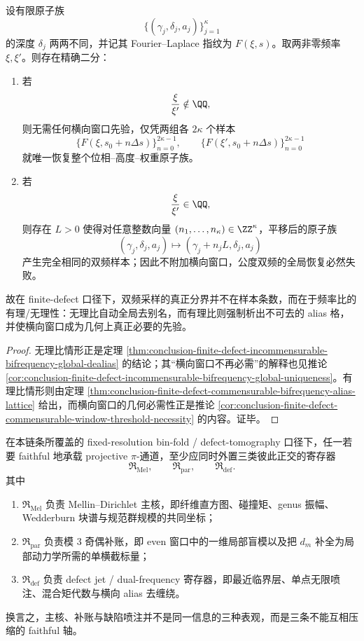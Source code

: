 \begin{theorem}\label{thm:conclusion-bifrequency-dealias-rational-irrational-dichotomy}
设有限原子族
\[
\{(\gamma_j,\delta_j,a_j)\}_{j=1}^{\kappa}
\]
的深度 \(\delta_j\) 两两不同，并记其 Fourier--Laplace 指纹为 \(F(\xi,s)\)。取两非零频率 \(\xi,\xi'\)。则存在精确二分：
\begin{enumerate}
  \item 若
  \[
  \frac{\xi}{\xi'}\notin\QQ,
  \]
  则无需任何横向窗口先验，仅凭两组各 \(2\kappa\) 个样本
  \[
  \{F(\xi,s_0+n\Delta s)\}_{n=0}^{2\kappa-1},
  \qquad
  \{F(\xi',s_0+n\Delta s)\}_{n=0}^{2\kappa-1}
  \]
  就唯一恢复整个位相--高度--权重原子族。
  \item 若
  \[
  \frac{\xi}{\xi'}\in\QQ,
  \]
  则存在 \(L>0\) 使得对任意整数向量 \((n_1,\dots,n_\kappa)\in\ZZ^\kappa\)，平移后的原子族
  \[
  (\gamma_j,\delta_j,a_j)\mapsto (\gamma_j+n_jL,\delta_j,a_j)
  \]
  产生完全相同的双频样本；因此不附加横向窗口，公度双频的全局恢复必然失败。
\end{enumerate}
故在 finite-defect 口径下，双频采样的真正分界并不在样本条数，而在于频率比的有理/无理性：无理比自动全局去别名，而有理比则强制析出不可去的 alias 格，并使横向窗口成为几何上真正必要的先验。
\end{theorem}
\begin{proof}
无理比情形正是定理 \ref{thm:conclusion-finite-defect-incommensurable-bifrequency-global-dealias} 的结论；其“横向窗口不再必需”的解释也见推论 \ref{cor:conclusion-finite-defect-incommensurable-bifrequency-global-uniqueness}。有理比情形则由定理 \ref{thm:conclusion-finite-defect-commensurable-bifrequency-alias-lattice} 给出，而横向窗口的几何必需性正是推论 \ref{cor:conclusion-finite-defect-commensurable-window-threshold-necessity} 的内容。证毕。
\end{proof}

\begin{conjecture}\label{conj:conclusion-faithful-fixedresolution-pi-audit-three-register-lowerbound}
在本链条所覆盖的 fixed-resolution bin-fold / defect-tomography 口径下，任一若要 faithful 地承载 projective \(\pi\)-通道，至少应同时外置三类彼此正交的寄存器
\[
\mathfrak R_{\mathrm{Mel}},
\qquad
\mathfrak R_{\mathrm{par}},
\qquad
\mathfrak R_{\mathrm{def}}.
\]
其中
\begin{enumerate}
  \item \(\mathfrak R_{\mathrm{Mel}}\) 负责 Mellin--Dirichlet 主核，即纤维直方图、碰撞矩、genus 振幅、Wedderburn 块谱与规范群规模的共同坐标；
  \item \(\mathfrak R_{\mathrm{par}}\) 负责模 \(3\) 奇偶补账，即 even 窗口中的一维局部盲模以及把 \(d_m\) 补全为局部动力学所需的单横截标量；
  \item \(\mathfrak R_{\mathrm{def}}\) 负责 defect jet / dual-frequency 寄存器，即最近临界层、单点无限喷注、混合矩代数与横向 alias 去缠绕。
\end{enumerate}
换言之，主核、补账与缺陷喷注并不是同一信息的三种表观，而是三条不能互相压缩的 faithful 轴。
\end{conjecture}

